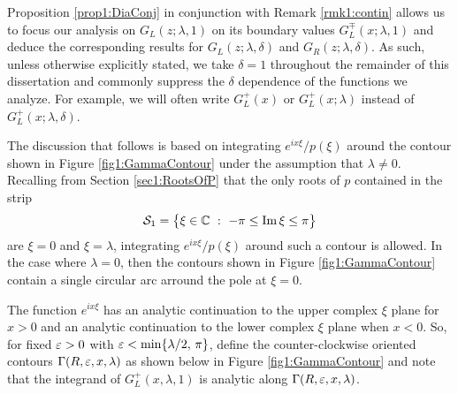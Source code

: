 \documentclass[../dissertation.tex]{subfiles}
\begin{document}
\begin{rmk}\label{rmk1:wlog}
	Proposition \ref{prop1:DiaConj} in conjunction with Remark \ref{rmk1:contin} allows 
	us to focus our analysis on $G_L(z; \lambda, 1)$ on its boundary values
	$G_L^\mp(x; \lambda, 1)$ and deduce the corresponding results for 
	$G_L(z; \lambda, \delta)$ and $G_R(z; \lambda, \delta)$. As such, unless otherwise 
	explicitly stated, we take $\delta = 1$ throughout the remainder of this 
	dissertation and commonly suppress the $\delta$ dependence of the functions we
	analyze. For example, we will often write $G_L^+(x)$ or $G_L^+(x; \lambda)$ instead
	of $G_L^+(x; \lambda, \delta)$.
\end{rmk}

The discussion that follows is based on integrating
$e^{ix\xi} / p(\xi)$ around the contour shown in Figure \ref{fig1:GammaContour}
under the assumption that $\lambda \ne 0$.
Recalling from Section \ref{sec1:RootsOfP} that the only roots of $p$ contained 
in the strip
\[
	\mathcal S_1 = \big\{ \xi \in \mathbb C ~:~ -\pi \leq \operatorname{Im} \xi \leq \pi \big\}
\]
are $\xi = 0$ and $\xi = \lambda$, integrating $e^{ix\xi} / p(\xi)$ around such a 
contour is allowed. In the case where $\lambda=0$, then the contours shown in 
Figure \ref{fig1:GammaContour} contain a single circular arc arround the pole
at $\xi = 0$. 


The function $e^{ix\xi}$ has an analytic continuation to the upper complex $\xi$ 
plane for $x > 0$ and an analytic continuation to the lower complex $\xi$ plane
when $x < 0$. So, for fixed $\varepsilon > 0$ with $\varepsilon < \min\{\lambda /2, \, \pi\}$, define 
the counter-clockwise oriented contours $\Gamma(R, \varepsilon, x, \lambda)$ as shown below in 
Figure \ref{fig1:GammaContour} and 
note that the integrand of $G_L^+(x, \lambda, 1)$ is analytic along $\Gamma(R, \varepsilon, x, \lambda)$.
\end{document}
